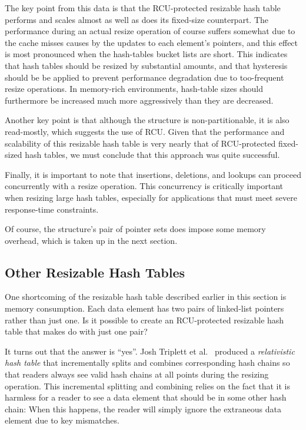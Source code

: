 The key point from this data is that the RCU-protected resizable hash
table performs and scales almost as well as does its fixed-size counterpart.
The performance during an actual resize operation of course suffers
somewhat due to the cache misses causes by the updates to each element's
pointers, and this effect is most pronounced when the hash-tables
bucket lists are short.
This indicates that hash tables should be resized by substantial amounts,
and that hysteresis should be be applied to prevent performance degradation
due to too-frequent resize operations.
In memory-rich environments, hash-table sizes should furthermore
be increased much more aggressively than they are decreased.

Another key point is that although the  structure is
non-partitionable, it is also read-mostly, which suggests the use
of RCU.
Given that the performance and scalability of this resizable hash table is
very nearly that of RCU-protected fixed-sized hash tables, we must
conclude that this approach was quite successful.

Finally, it is important to note that insertions, deletions, and
lookups can proceed concurrently with a resize operation.
This concurrency is
critically important when resizing large hash tables, especially
for applications that must meet severe response-time constraints.

Of course, the  structure's
pair of pointer sets does impose some memory overhead,
which is taken up in the next section.

\subsection{Other Resizable Hash Tables}
\label{sec:datastruct:Other Resizable Hash Tables}

One shortcoming of the resizable hash table described earlier in this
section is memory consumption.
Each data element has two pairs of linked-list pointers rather than just
one.
Is it possible to create an RCU-protected resizable hash table that
makes do with just one pair?

It turns out that the answer is ``yes''.
Josh Triplett et al.~\cite{Triplett:2011:RPHash}
produced a \emph{relativistic hash table} that incrementally
splits and combines corresponding hash chains so that readers always
see valid hash chains at all points during the resizing operation.
This incremental splitting and combining relies on the fact that it
is harmless for a reader to see a data element that should be in some
other hash chain: When this happens, the reader will simply ignore the
extraneous data element due to key mismatches.

